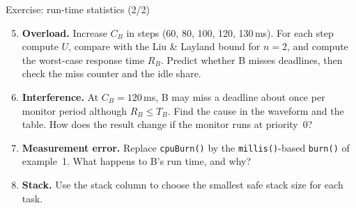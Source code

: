 \begin{frame}{Exercise: run-time statistics (2/2)}
  \begin{enumerate}
    \setcounter{enumi}{4}
    \item \textbf{Overload.} Increase $C_B$ in steps (60, 80, 100, 120, 130\,ms). For each step compute $U$, compare with the Liu \& Layland bound for $n=2$, and compute the worst-case response time $R_B$. Predict whether B misses deadlines, then check the miss counter and the idle share.
    \item \textbf{Interference.} At $C_B = 120$\,ms, B may miss a deadline about once per monitor period although $R_B \le T_B$. Find the cause in the waveform and the table. How does the result change if the monitor runs at priority~0?
    \item \textbf{Measurement error.} Replace \texttt{cpuBurn()} by the \texttt{millis()}-based \texttt{burn()} of example~1. What happens to B's run time, and why?
    \item \textbf{Stack.} Use the stack column to choose the smallest safe stack size for each task.
  \end{enumerate}
\end{frame}

